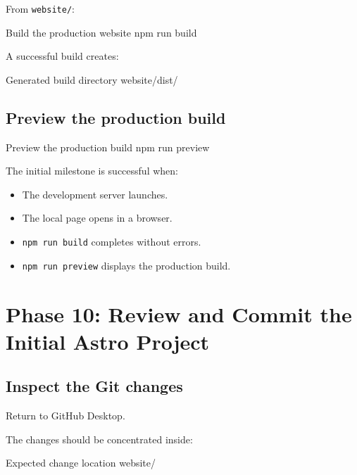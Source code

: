 \documentclass[11pt,letterpaper]{article}
\newcommand{\filepath}[1]{\texttt{#1}}
\begin{document}
From \filepath{website/}:

\begin{commandbox}{Build the production website}
npm run build
\end{commandbox}

A successful build creates:

\begin{codebox}{Generated build directory}
website/dist/
\end{codebox}

\subsection{Preview the production build}

\begin{commandbox}{Preview the production build}
npm run preview
\end{commandbox}

\begin{successbox}
The initial milestone is successful when:

\begin{itemize}
    \item The development server launches.
    \item The local page opens in a browser.
    \item \texttt{npm run build} completes without errors.
    \item \texttt{npm run preview} displays the production build.
\end{itemize}
\end{successbox}

\section{Phase 10: Review and Commit the Initial Astro Project}

\subsection{Inspect the Git changes}

Return to GitHub Desktop.

The changes should be concentrated inside:

\begin{codebox}{Expected change location}
website/
\end{codebox}
\end{document}
